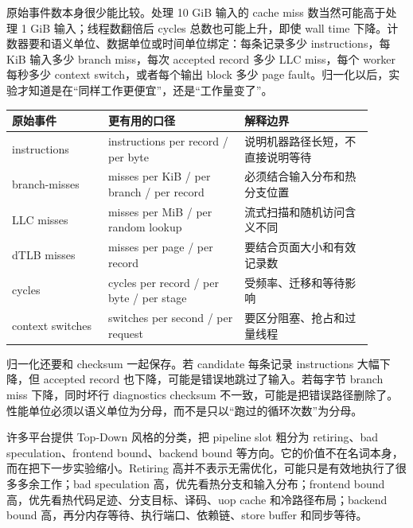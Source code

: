 原始事件数本身很少能比较。处理 10 GiB 输入的 cache miss 数当然可能高于处理 1 GiB 输入；线程数翻倍后 cycles 总数也可能上升，即使 wall time 下降。计数器要和语义单位、数据单位或时间单位绑定：每条记录多少 instructions，每 KiB 输入多少 branch miss，每次 accepted record 多少 LLC miss，每个 worker 每秒多少 context switch，或者每个输出 block 多少 page fault。归一化以后，实验才知道是在“同样工作更便宜”，还是“工作量变了”。

\begin{center}
\small
\begin{tabular}{@{}p{0.24\linewidth}p{0.34\linewidth}p{0.32\linewidth}@{}}
\toprule
原始事件 & 更有用的口径 & 解释边界 \\
\midrule
instructions & instructions per record / per byte & 说明机器路径长短，不直接说明等待 \\
branch-misses & misses per KiB / per branch / per record & 必须结合输入分布和热分支位置 \\
LLC misses & misses per MiB / per random lookup & 流式扫描和随机访问含义不同 \\
dTLB misses & misses per page / per record & 要结合页面大小和有效记录数 \\
cycles & cycles per record / per byte / per stage & 受频率、迁移和等待影响 \\
context switches & switches per second / per request & 要区分阻塞、抢占和过量线程 \\
\bottomrule
\end{tabular}
\end{center}

归一化还要和 checksum 一起保存。若 candidate 每条记录 instructions 大幅下降，但 accepted record 也下降，可能是错误地跳过了输入。若每字节 branch miss 下降，同时坏行 diagnostics checksum 不一致，可能是把错误路径删除了。性能单位必须以语义单位为分母，而不是只以“跑过的循环次数”为分母。

许多平台提供 Top-Down 风格的分类，把 pipeline slot 粗分为 retiring、bad speculation、frontend bound、backend bound 等方向。它的价值不在名词本身，而在把下一步实验缩小。Retiring 高并不表示无需优化，可能只是有效地执行了很多多余工作；bad speculation 高，优先看热分支和输入分布；frontend bound 高，优先看热代码足迹、分支目标、译码、uop cache 和冷路径布局；backend bound 高，再分内存等待、执行端口、依赖链、store buffer 和同步等待。

